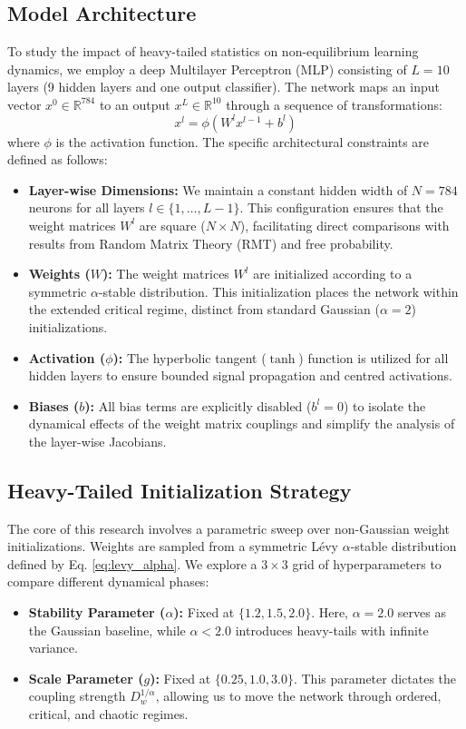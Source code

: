 \documentclass[11pt,a4paper]{article}
\begin{document}
\subsection{Model Architecture}
To study the impact of heavy-tailed statistics on non-equilibrium learning dynamics, we employ a deep Multilayer Perceptron (MLP) consisting of $L=10$ layers (9 hidden layers and one output classifier). The network maps an input vector $x^0 \in \mathbb{R}^{784}$ to an output $x^L \in \mathbb{R}^{10}$ through a sequence of transformations:
\begin{equation}
    x^l = \phi(W^l x^{l-1} + b^l)
\end{equation}
where $\phi$ is the activation function. The specific architectural constraints are defined as follows:

\begin{itemize}
    \item \textbf{Layer-wise Dimensions:} We maintain a constant hidden width of $N=784$ neurons for all layers $l \in \{1, \dots, L-1\}$. This configuration ensures that the weight matrices $W^l$ are square ($N \times N$), facilitating direct comparisons with results from Random Matrix Theory (RMT) and free probability.
    \item \textbf{Weights ($W$):} The weight matrices $W^l$ are initialized according to a symmetric $\alpha$-stable distribution. This initialization places the network within the extended critical regime, distinct from standard Gaussian ($\alpha=2$) initializations.
    \item \textbf{Activation ($\phi$):} The hyperbolic tangent ($\tanh$) function is utilized for all hidden layers to ensure bounded signal propagation and centred activations.
    \item \textbf{Biases ($b$):} All bias terms are explicitly disabled ($b^l=0$) to isolate the dynamical effects of the weight matrix couplings and simplify the analysis of the layer-wise Jacobians.
\end{itemize}

\subsection{Heavy-Tailed Initialization Strategy}
The core of this research involves a parametric sweep over non-Gaussian weight initializations. Weights are sampled from a symmetric L\'{e}vy $\alpha$-stable distribution defined by Eq. \ref{eq:levy_alpha}. We explore a $3 \times 3$ grid of hyperparameters to compare different dynamical phases:
\begin{itemize}
    \item \textbf{Stability Parameter ($\alpha$):} Fixed at $\{1.2, 1.5, 2.0\}$. Here, $\alpha=2.0$ serves as the Gaussian baseline, while $\alpha < 2.0$ introduces heavy-tails with infinite variance.
    \item \textbf{Scale Parameter ($g$):} Fixed at $\{0.25, 1.0, 3.0\}$. This parameter dictates the coupling strength $D_w^{1/\alpha}$, allowing us to move the network through ordered, critical, and chaotic regimes.
\end{itemize}
\end{document}
